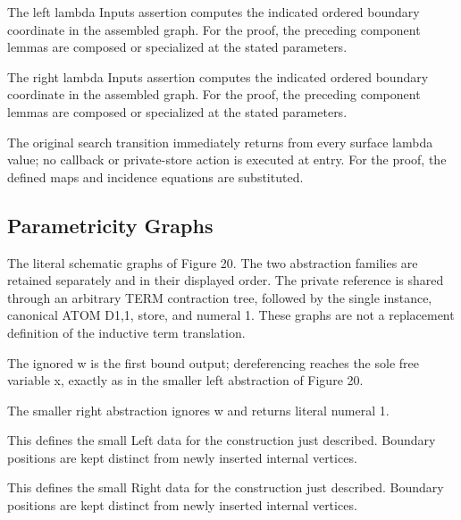 The left lambda Inputs assertion computes the indicated ordered boundary coordinate in the assembled graph.
For the proof, the preceding component lemmas are composed or specialized at the stated parameters.
\par{}

The right lambda Inputs assertion computes the indicated ordered boundary coordinate in the assembled graph.
For the proof, the preceding component lemmas are composed or specialized at the stated parameters.
\par{}

The original search transition immediately returns from every surface lambda value; no callback or private-store action is executed at entry.
For the proof, the defined maps and incidence equations are substituted.
\par{}

\subsection{Parametricity Graphs}
The literal schematic graphs of Figure 20. The two abstraction families are retained separately and in their displayed order. The private reference is shared through an arbitrary TERM contraction tree, followed by the single instance, canonical ATOM D1,1, store, and numeral 1. These graphs are not a replacement definition of the inductive term translation.

The ignored w is the first bound output; dereferencing reaches the sole free variable x, exactly as in the smaller left abstraction of Figure 20.
\par{}

The smaller right abstraction ignores w and returns literal numeral 1.
\par{}

This defines the small Left data for the construction just described. Boundary positions are kept distinct from newly inserted internal vertices.
\par{}

This defines the small Right data for the construction just described. Boundary positions are kept distinct from newly inserted internal vertices.
\par{}

